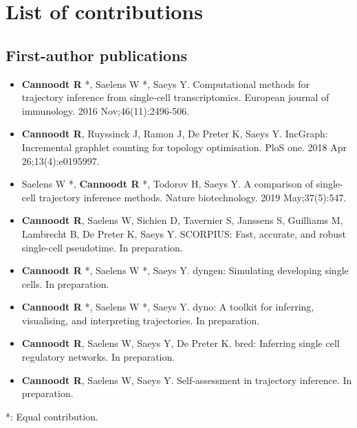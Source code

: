 \section{List of contributions}

\subsection{First-author publications}

\begin{itemize}
	\item \textbf{Cannoodt R} *, Saelens W *, Saeys Y. Computational methods for trajectory inference from single-cell transcriptomics. European journal of immunology. 2016 Nov;46(11):2496-506.
	\item \textbf{Cannoodt R}, Ruyssinck J, Ramon J, De Preter K, Saeys Y. IncGraph: Incremental graphlet counting for topology optimisation. PloS one. 2018 Apr 26;13(4):e0195997.
	\item Saelens W *, \textbf{Cannoodt R} *, Todorov H, Saeys Y. A comparison of single-cell trajectory inference methods. Nature biotechnology. 2019 May;37(5):547.
	\item \textbf{Cannoodt R}, Saelens W, Sichien D, Tavernier S, Janssens S, Guilliams M, Lambrecht B, De Preter K, Saeys Y. SCORPIUS: Fast, accurate, and robust single-cell pseudotime. In preparation.
	\item \textbf{Cannoodt R} *, Saelens W *, Saeys Y. dyngen: Simulating developing single cells. In preparation.
	\item \textbf{Cannoodt R} *, Saelens W *, Saeys Y. dyno: A toolkit for inferring, visualising, and interpreting trajectories. In preparation.
	\item \textbf{Cannoodt R}, Saelens W, Saeys Y, De Preter K. bred: Inferring single cell regulatory networks. In preparation. 
	\item \textbf{Cannoodt R}, Saelens W, Saeys Y. Self-assessment in trajectory inference. In preparation.
\end{itemize}

*: Equal contribution.

